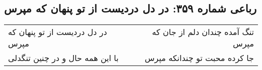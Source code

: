 \begin{center}
\section*{رباعی شماره ۳۵۹: در دل دردیست از تو پنهان که مپرس}
\label{sec:sh359}
\begin{longtable}{l p{0.5cm} r}
در دل دردیست از تو پنهان که مپرس
&&
تنگ آمده چندان دلم از جان که مپرس
\\
با این همه حال و در چنین تنگدلی
&&
جا کرده محبت تو چندانکه مپرس
\\
\end{longtable}
\end{center}
